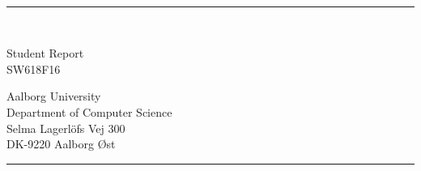 \newcommand{\titlefont}{\sffamily\fontsize{36pt}{0pt}\selectfont}
\newcommand{\subtitlefont}{\sffamily\fontsize{26pt}{0pt}\selectfont}
\newcommand{\otherfont}{\sffamily\fontsize{18pt}{0pt}\selectfont}
\begin{titlepage}
    \addtolength{\hoffset}{0.5\evensidemargin-0.5\oddsidemargin}
    \noindent
    \vspace{1.5cm}
    \begin{center}
        {
            \titlefont
            \TITLE
        }\hfill \\
        \textcolor{aaublue}{\rule{120pt}{2pt}}\\
        \vspace{10pt}
        {\subtitlefont
            \SUBTITLE
        }
    \end{center}
    \vspace{4cm}
    \begin{center}
            \otherfont
            Student Report\\
            SW618F16
    \end{center}
    \vfill
    \noindent
\hfill
\begin{minipage}{0.8\linewidth}
    \begin{flushright}
        \sffamily\fontsize{14pt}{0pt}\selectfont
        Aalborg University\\
        Department of Computer Science\\
        Selma Lagerl{\"o}fs Vej 300\\
        DK-9220 Aalborg {\O}st
    \end{flushright}
\end{minipage}
%
\begin{minipage}{0.02\linewidth}
    \textcolor{aaublue}{\rule{1pt}{5\baselineskip}}
\end{minipage}
    \titlepagedecoration
\end{titlepage}
\clearpage 
